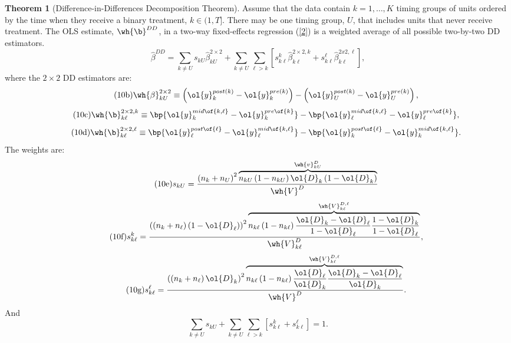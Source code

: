 \documentclass[12pt]{article}
\theoremstyle{definition}
\newtheorem{theorem}{Theorem}
\begin{document}
\begin{theorem}[Difference-in-Differences Decomposition Theorem] \label{thm1}
    Assume that the data contain $k=1, \ldots, K$ timing groups of units ordered by the time when they receive a binary treatment, $k \in (1, T]$. There may be one timing group, $U$, that includes units that never receive treatment. The OLS estimate, $\wh{\b}^{DD}$, in a two-way fixed-effects regression (\ref{2}) is a weighted average of all possible two-by-two DD estimators.
    \begin{equation}
        \tag{10a} \label{10a}
        \hat{\beta}^{D D}=\sum_{k \neq U} s_{k U} \hat{\beta}_{k U}^{2 \times 2}+\sum_{k \neq U} \sum_{\ell>k}\left[s_{k \ell}^k \hat{\beta}_{k \ell}^{2 \times 2, k}+s_{k \ell}^{\ell} \hat{\beta}_{k \ell}^{2 x 2, \ell}\right] ,
    \end{equation}
    where the $2\times2$ DD estimators are:
    \begin{equation}
        \tag{10b} \label{10b}
        \wh{\beta}_{k U}^{2 \times 2} \equiv\left(\ol{y}_k^{{post}(k)}-\ol{y}_k^{{pre}(k)}\right)-\left(\ol{y}_U^{{post}(k)}-\ol{y}_U^{{pre}(k)}\right),
    \end{equation}
    \begin{equation}
        \tag{10c} \label{10c}
        \wh{\b}_{k\ell}^{2\times 2, k} \equiv \bp{\ol{y}_{k}^{mid\of{k, \ell}} - \ol{y}_{k}^{pre\of{k}}} - \bp{\ol{y}_{\ell}^{mid\of{k, \ell}} - \ol{y}_{\ell}^{pre\of{k}}},
    \end{equation}
    \begin{equation}
        \tag{10d} \label{10d}
        \wh{\b}_{k\ell}^{2\times 2, \ell} \equiv \bp{\ol{y}_{\ell}^{post\of{\ell}} - \ol{y}_{\ell}^{mid\of{k, \ell}}} - \bp{\ol{y}_{k}^{post\of{\ell}} - \ol{y}_{k}^{mid\of{k, \ell}}}.
    \end{equation}
    The weights are:
    \begin{equation}
        \tag{10e} \label{10e}
        s_{k U}=\frac{\left(n_k+n_U\right)^2 \overbrace{n_{k U}\left(1-n_{k U}\right) \ol{D}_k\left(1-\ol{D}_k\right)}^{\wh{v}_{k U}^D}}{\wh{V}^D}
    \end{equation}
    \begin{equation}
        \tag{10f} \label{10f}
        s_{k \ell}^k=\frac{\left(\left(n_k+n_{\ell}\right)\left(1-\ol{D}_{\ell}\right)\right)^2 \overbrace{n_{k \ell}\left(1-n_{k \ell}\right) \frac{\ol{D}_k-\ol{D}_{\ell}}{1-\ol{D}_{\ell}} \frac{1-\ol{D}_k}{1-\ol{D}_{\ell}}}^{\wh{V}_{k\ell}^{D, \ell}}}{\wh{V}_{k \ell}^D},
    \end{equation}
    \begin{equation}
        \tag{10g} \label{10g}
        s_{k \ell}^{\ell}=\frac{\left(\left(n_k+n_{\ell}\right) \ol{D}_k\right)^2 \overbrace{n_{k \ell}\left(1-n_{k \ell}\right) \frac{\ol{D}_{\ell}}{\ol{D}_k} \frac{\ol{D}_k-\ol{D}_{\ell}}{\ol{D}_k}}^{\wh{V}_{k\ell}^{D, \ell}}}{\wh{V}^D}.
    \end{equation}
    And 
    $$
    \sum_{k \neq U} s_{k U}+\sum_{k \neq U} \sum_{\ell>k}\left[s_{k \ell}^k+s_{k \ell}^{\ell}\right]=1 .
    $$
\end{theorem}
\end{document}
